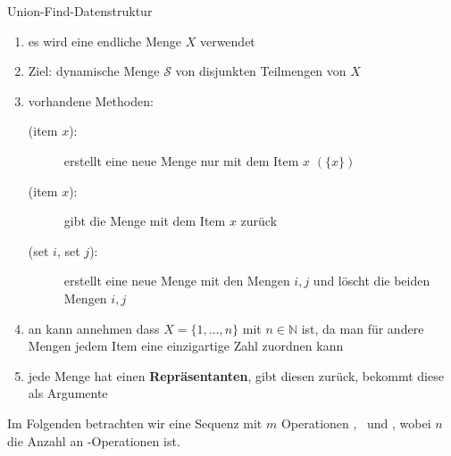 \begin{TOP}{Union-Find-Datenstruktur}
\vspace*{-2\baselineskip}
	\begin{enumerate}
		\item es wird eine endliche Menge $X$ verwendet
		\item Ziel: dynamische Menge $\mathcal{S}$ von disjunkten Teilmengen von $X$
		\item vorhandene Methoden:
			\begin{description}
				\item[\makeset(item $x$):] erstellt eine neue Menge nur mit dem Item $x$ $(\{x\})$
				\item[\find(item $x$):] gibt die Menge mit dem Item $x$ zurück
				\item[\union(set $i$, set $j$):] erstellt eine neue Menge mit den Mengen $i,j$ und löscht die beiden Mengen $i,j$
			\end{description}
		\item an kann annehmen dass $X=\{1,\dots,n\}$ mit $n \in \mathbb{N}$ ist, da man für andere Mengen jedem Item eine einzigartige Zahl zuordnen kann
		\item jede Menge hat einen \textbf{Repräsentanten}, \find gibt diesen zurück, \union bekommt diese als Argumente
	\end{enumerate}
	Im Folgenden betrachten wir eine Sequenz mit $m$ Operationen \makeset, \find~und \union, wobei $n$ die Anzahl an \makeset-Operationen ist.\\\ \\
\end{TOP}